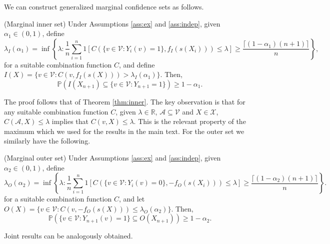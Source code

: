 We can construct generalized marginal confidence sets as follows.
\begin{theorem}\label{thm:innergen}
	(Marginal inner set)
	Under Assumptions \ref{ass:ex} and \ref{ass:indep}, given $\alpha_1 \in (0,1)$, define 
	\begin{equation*}
		\lambda_I(\alpha_1) = \inf\left\lbrace \lambda: \frac{1}{n} \sum_{i = 1}^n 1\left[ C(\lbrace v \in \mathcal{V}: Y_i(v) = 1\rbrace, f_I(s(X_i))) \leq \lambda \right] \geq \frac{\lceil (1-\alpha_1)(n+1) \rceil}{n} \right\rbrace,
	\end{equation*}
 	for a suitable combination function $C$, and define $I(X) = \lbrace v \in \mathcal{V}: C(v, f_I(s(X))) >\lambda_I(\alpha_1)  \rbrace $. Then,
	\begin{equation}\label{eq:probstat}
		\mathbb{P}\left( I(X_{n+1}) \subseteq\lbrace v\in \mathcal{V}: Y_{n+1} = 1 \rbrace \right) \geq 1 - \alpha_1.
	\end{equation}
\end{theorem}
The proof follows that of Theorem \ref{thm:inner}. The key observation is that for any suitable combination function $C$,  given $\lambda \in \mathbb{R}$, $\mathcal{A} \subseteq \mathcal{V} $ and $X \in \mathcal{X}$, $C(\mathcal{A}, X) \leq \lambda$ implies that $C(v, X) \leq \lambda$. This is the relevant property of the maximum which we used for the results in the main text. For the outer set we similarly have the following.
\begin{theorem}\label{thm:genouter}
	(Marginal outer set)
	Under Assumptions \ref{ass:ex} and \ref{ass:indep}, given $\alpha_2 \in (0,1)$, define 
	\begin{equation*}
		\lambda_O({\alpha_2})= \inf\left\lbrace \lambda: \frac{1}{n} \sum_{i = 1}^n 1\left[ C(\lbrace v \in \mathcal{V}: Y_i(v) = 0\rbrace, -f_O(s(X_i))) \leq \lambda \right] \geq \frac{\lceil (1-\alpha_2)(n+1) \rceil}{n} \right\rbrace.
	\end{equation*}
	for a suitable combination function $C$, and let $O(X) = \lbrace v \in \mathcal{V}: C(v, -f_O(s(X))) \leq \lambda_O(\alpha_2)  \rbrace $. Then,
	\begin{equation}\label{eq:probstat}
		\mathbb{P}\left( \lbrace v\in \mathcal{V}: Y_{n+1}(v) = 1 \rbrace \subseteq O(X_{n+1}) \right) \geq 1 - \alpha_2.
	\end{equation}
\end{theorem}
Joint results can be analogously obtained. 

